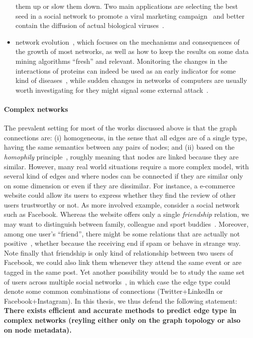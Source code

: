 \begin{itemize}[nosep,leftmargin=*]
    them up or slow them down. Two main applications are selecting the best seed in a social
    network to promote a viral marketing campaign~\autocite{infmaxKempe15} and better contain the
    diffusion of actual biological viruses~\autocite{influenceBio13}.
  \item network evolution~\autocite{networkEvolution14}, which focuses on the mechanisms and
    consequences of the growth of most networks, as well as how to keep the results on some data
    mining algorithms \enquote{fresh} and relevant. Monitoring the changes in the interactions of
    proteins can indeed be used as an early indicator for some kind of
    diseases~\autocite{evolBio10}, while sudden changes in networks of computers are usually worth
    investigating for they might signal some external attack~\autocite{evolSecurity04}.
\end{itemize}

\vspace{-\baselineskip}
\paragraph{Complex networks}

The prevalent setting for most of the works discussed above is that the graph connections are: (i)
homogeneous, in the sense that all edges are of a single type, having the same semantics  between
any pairs of nodes; and (ii) based on the \emph{homophily} principle~\autocite{Homophily01}, roughly
meaning that nodes are linked because they are similar. However, many real world situations require
a more complex model, with several kind of edges and where nodes can be connected if they are
similar only on some dimension or even if they are dissimilar. For instance, a e-commerce website
could allow its users to express whether they find the review of other users trustworthy or not. As
more involved example, consider a social network such as Facebook. Whereas the website offers only a
single \emph{friendship} relation, we may want to distinguish between family, colleague and sport
buddies~\autocite{egoNips12}. Moreover, among one user's \enquote{friend}, there might be some
relations that are actually not positive~\autocite{Yang2012}, whether because the receiving end if
spam or behave in strange way. Note finally that friendship is only kind of relationship between two
users of Facebook, we could also link them whenever they attend the same event or are tagged in the
same post. Yet another possibility would be to study the same set of users across multiple social
networks~\autocite{mergingNetworks16}, in which case the edge type could denote some common
combinations of connections (\eg Twitter+LinkedIn or Facebook+Instagram). In this thesis, we thus
defend the following statement: \textbf{There exists efficient and accurate methods to predict edge
type in complex networks (reyling either only on the graph topology or also on node metadata).}

